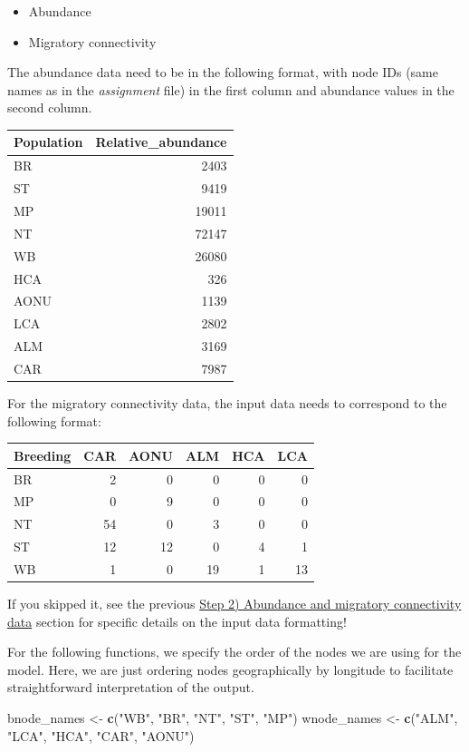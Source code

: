 \documentclass[
]{book}
\newenvironment{Shaded}{\begin{snugshade}}{\end{snugshade}}
\newcommand{\FunctionTok}[1]{\textcolor[rgb]{0.13,0.29,0.53}{\textbf{#1}}}
\newcommand{\NormalTok}[1]{#1}
\newcommand{\OtherTok}[1]{\textcolor[rgb]{0.56,0.35,0.01}{#1}}
\newcommand{\StringTok}[1]{\textcolor[rgb]{0.31,0.60,0.02}{#1}}
\providecommand{\tightlist}{%
  \setlength{\itemsep}{0pt}\setlength{\parskip}{0pt}}
\begin{document}
\begin{itemize}
\tightlist
\item
  Abundance
\item
  Migratory connectivity
\end{itemize}

The abundance data need to be in the following format, with node IDs (same names as in the \emph{assignment} file) in the first column and abundance values in the second column.

\begin{tabular}{l|r}
\hline
Population & Relative\_abundance\\
\hline
BR & 2403\\
\hline
ST & 9419\\
\hline
MP & 19011\\
\hline
NT & 72147\\
\hline
WB & 26080\\
\hline
HCA & 326\\
\hline
AONU & 1139\\
\hline
LCA & 2802\\
\hline
ALM & 3169\\
\hline
CAR & 7987\\
\hline
\end{tabular}

For the migratory connectivity data, the input data needs to correspond to the following format:

\begin{tabular}{l|r|r|r|r|r}
\hline
Breeding & CAR & AONU & ALM & HCA & LCA\\
\hline
BR & 2 & 0 & 0 & 0 & 0\\
\hline
MP & 0 & 9 & 0 & 0 & 0\\
\hline
NT & 54 & 0 & 3 & 0 & 0\\
\hline
ST & 12 & 12 & 0 & 4 & 1\\
\hline
WB & 1 & 0 & 19 & 1 & 13\\
\hline
\end{tabular}

If you skipped it, see the previous \protect\hyperlink{data}{Step 2) Abundance and migratory connectivity data} section for specific details on the input data formatting!

For the following functions, we specify the order of the nodes we are using for the model. Here, we are just ordering nodes geographically by longitude to facilitate straightforward interpretation of the output.

\begin{Shaded}
\begin{Highlighting}[]
\NormalTok{bnode\_names }\OtherTok{\textless{}{-}} \FunctionTok{c}\NormalTok{(}\StringTok{"WB"}\NormalTok{, }\StringTok{"BR"}\NormalTok{, }\StringTok{"NT"}\NormalTok{, }\StringTok{"ST"}\NormalTok{, }\StringTok{"MP"}\NormalTok{)}
\NormalTok{wnode\_names }\OtherTok{\textless{}{-}} \FunctionTok{c}\NormalTok{(}\StringTok{"ALM"}\NormalTok{, }\StringTok{"LCA"}\NormalTok{, }\StringTok{"HCA"}\NormalTok{, }\StringTok{"CAR"}\NormalTok{, }\StringTok{"AONU"}\NormalTok{)}
\end{Highlighting}
\end{Shaded}
\end{document}
